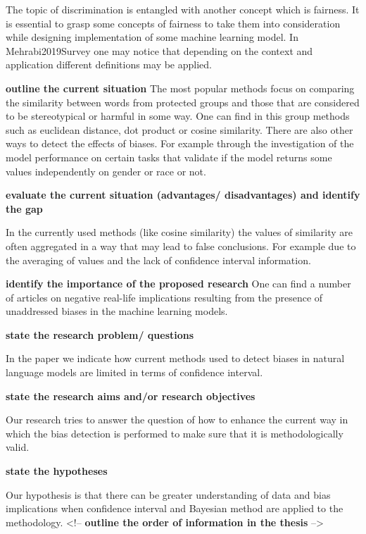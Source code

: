 \documentclass[12pt,]{book}
\begin{document}
The topic of discrimination is entangled with another concept which is
fairness. It is essential to grasp some concepts of fairness to take
them into consideration while designing implementation of some machine
learning model. In Mehrabi2019Survey one may notice that depending on
the context and application different definitions may be applied.
\newline

\textbf{outline the current situation} The most popular methods focus on
comparing the similarity between words from protected groups and those
that are considered to be stereotypical or harmful in some way. One can
find in this group methods such as euclidean distance, dot product or
cosine similarity. There are also other ways to detect the effects of
biases. For example through the investigation of the model performance
on certain tasks that validate if the model returns some values
independently on gender or race or not. \newline

\textbf{evaluate the current situation (advantages/ disadvantages) and identify the gap}

In the currently used methods (like cosine similarity) the values of
similarity are often aggregated in a way that may lead to false
conclusions. For example due to the averaging of values and the lack of
confidence interval information. \newline

\textbf{identify the importance of the proposed research} One can find a
number of articles on negative real-life implications resulting from the
presence of unaddressed biases in the machine learning models. \newline

\textbf{state the research problem/ questions}

In the paper we indicate how current methods used to detect biases in
natural language models are limited in terms of confidence interval.
\newline

\textbf{state the research aims and/or research objectives}

Our research tries to answer the question of how to enhance the current
way in which the bias detection is performed to make sure that it is
methodologically valid. \newline

\textbf{state the hypotheses}

Our hypothesis is that there can be greater understanding of data and
bias implications when confidence interval and Bayesian method are
applied to the methodology. \newline
<!-- \textbf{outline the order of information in the thesis} -->
\end{document}
